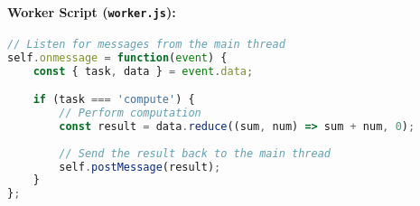 \paragraph{Worker Script (\texttt{worker.js}):}
\begin{lstlisting}[language=JavaScript, caption=Worker script]
// Listen for messages from the main thread
self.onmessage = function(event) {
    const { task, data } = event.data;

    if (task === 'compute') {
        // Perform computation
        const result = data.reduce((sum, num) => sum + num, 0);
        
        // Send the result back to the main thread
        self.postMessage(result);
    }
};
\end{lstlisting}



